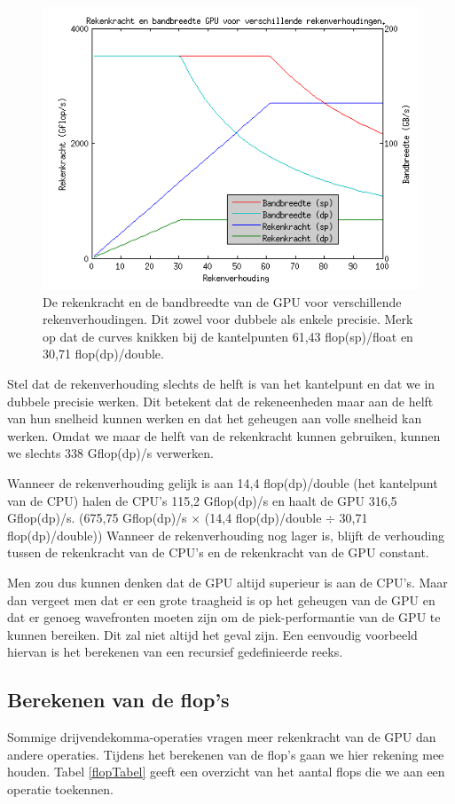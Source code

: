 \begin{figure}
\centering
\includegraphics{kantelpunt}
\caption{\label{kantelpunt}De rekenkracht en de bandbreedte van de GPU voor verschillende rekenverhoudingen. Dit zowel voor dubbele als enkele precisie. Merk op dat de curves knikken bij de kantelpunten 61,43 flop(sp)/float en 30,71 flop(dp)/double.}
\end{figure}

Stel dat de rekenverhouding slechts de helft is van het kantelpunt en dat we in dubbele precisie werken. Dit betekent dat de rekeneenheden maar aan de helft van hun snelheid kunnen werken en dat het geheugen aan volle snelheid kan werken. Omdat we maar de helft van de rekenkracht kunnen gebruiken, kunnen we slechts 338 Gflop(dp)/s verwerken.

Wanneer de rekenverhouding gelijk is aan 14,4 flop(dp)/double (het kantelpunt van de CPU) halen de CPU's 115,2 Gflop(dp)/s en haalt de GPU 316,5 Gflop(dp)/s. (675,75 Gflop(dp)/s $\times$ (14,4 flop(dp)/double $\div$ 30,71 flop(dp)/double)) Wanneer de rekenverhouding nog lager is, blijft de verhouding tussen de rekenkracht van de CPU's en de rekenkracht van de GPU constant.

Men zou dus kunnen denken dat de GPU altijd superieur is aan de CPU's. Maar dan vergeet men dat er een grote traagheid is op het geheugen van de GPU en dat er genoeg wavefronten moeten zijn om de piek-performantie van de GPU te kunnen bereiken. Dit zal niet altijd het geval zijn. Een eenvoudig voorbeeld hiervan is het berekenen van een recursief gedefinieerde reeks.

\subsection{Berekenen van de flop's}
Sommige drijvendekomma-operaties vragen meer rekenkracht van de GPU dan andere operaties. Tijdens het berekenen van de flop's gaan we hier rekening mee houden. Tabel \ref{flopTabel} geeft een overzicht van het aantal flops die we aan een operatie toekennen.

